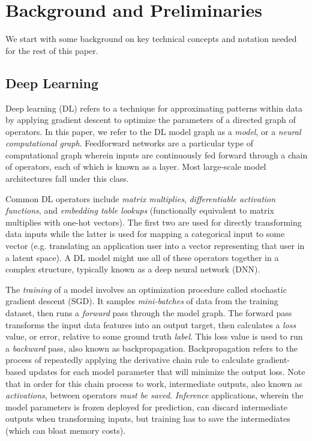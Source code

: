 
\section{Background and Preliminaries}
\label{sec:background}
We start with some background on key technical concepts and notation needed for the rest of this paper.
\subsection{Deep Learning}
Deep learning (DL) refers to a technique for approximating patterns within data by applying gradient descent to optimize the parameters of a directed graph of operators. In this paper, we refer to the DL model graph as a \textit{model}, or a \textit{neural computational graph}. Feedforward networks are a particular type of computational graph wherein inputs are continuously fed forward through a chain of operators, each of which is known as a layer. Most large-scale model architectures fall under this class.

Common DL operators include \textit{matrix multiplies}, \textit{differentiable activation functions}, and \textit{embedding table lookups} (functionally equivalent to matrix multiplies with one-hot vectors). The first two are used for directly transforming data inputs while the latter is used for mapping a categorical input to some vector (e.g. translating an application user into a vector representing that user in a latent space). A DL model might use all of these operators together in a complex structure, typically known as a deep neural network (DNN).

The \textit{training} of a model involves an optimization procedure called stochastic gradient descent (SGD). It samples \textit{mini-batches} of data from the training dataset, then runs a \textit{forward} pass through the model graph. The forward pass transforms the input data features into an output target, then calculates a \textit{loss} value, or error, relative to some ground truth \textit{label}. This loss value is used to run a \textit{backward} pass, also known as backpropagation. Backpropagation refers to the process of repeatedly applying the derivative chain rule to calculate gradient-based updates for each model parameter that will minimize the output loss. Note that in order for this chain process to work, intermediate outputs, also known as \textit{activations}, between operators \textit{must be saved}. \textit{Inference} applications, wherein the model parameters is frozen deployed for prediction, can discard intermediate outputs when transforming inputs, but training has to save the intermediates (which can bloat memory costs).

